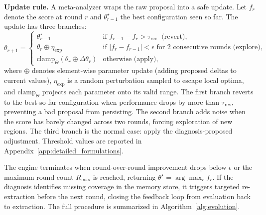 \noindent \textbf{Update rule.} A meta-analyzer wraps the raw proposal into a safe update. Let $f_r$ denote the score at round $r$ and $\theta_{r-1}^\star$ the best configuration seen so far. The update has three branches:
\begin{equation}
    \theta_{r+1} =
    \begin{cases}
        \theta_{r-1}^\star & \text{if } f_{r-1} - f_r > \tau_{\text{rev}} \;\;\text{(revert)}, \\[4pt]
        \theta_r \oplus \eta_{\text{exp}} & \text{if } |f_r - f_{r-1}| < \epsilon \text{ for 2 consecutive rounds (explore)}, \\[4pt]
        \mathrm{clamp}_{\Theta}(\theta_r \oplus \Delta\theta_r) & \text{otherwise (apply)},
    \end{cases}
    \label{eq:meta_update}
\end{equation}
where $\oplus$ denotes element-wise parameter update (adding proposed deltas to current values), $\eta_{\text{exp}}$ is a random perturbation sampled to escape local optima, and $\mathrm{clamp}_{\Theta}$ projects each parameter onto its valid range. The first branch reverts to the best-so-far configuration when performance drops by more than $\tau_{\text{rev}}$, preventing a bad proposal from persisting. The second branch adds noise when the score has barely changed across two rounds, forcing exploration of new regions. The third branch is the normal case: apply the diagnosis-proposed adjustment. Threshold values are reported in Appendix~\ref{app:detailed_formulations}.

The engine terminates when round-over-round improvement drops below $\epsilon$ or the maximum round count $R_{\max}$ is reached, returning $\theta^\star = \arg\max_{r} f_r$. If the diagnosis identifies missing coverage in the memory store, it triggers targeted re-extraction before the next round, closing the feedback loop from evaluation back to extraction. The full procedure is summarized in Algorithm~\ref{alg:evolution}.


